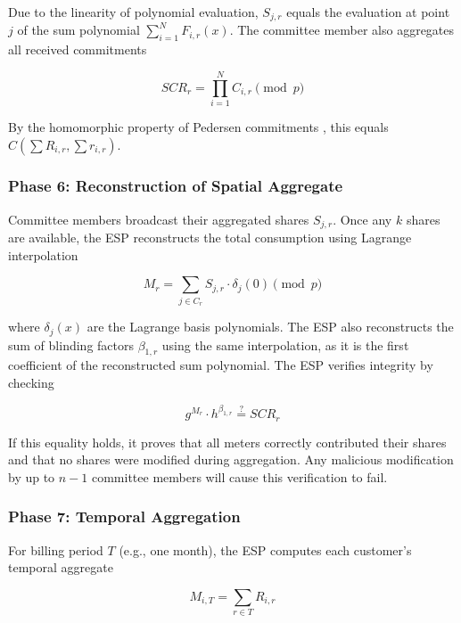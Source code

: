 \documentclass[conference]{IEEEtran}
\begin{document}
Due to the linearity of polynomial evaluation, $S_{j,r}$ equals the evaluation at point $j$ of the sum polynomial $\sum_{i=1}^{N} F_{i,r}(x)$. The committee member also aggregates all received commitments

\begin{equation}
\mathit{SCR}_r = \prod_{i=1}^{N} C_{i,r} \pmod{p}
\end{equation}

By the homomorphic property of Pedersen commitments \cite{pedersen1991non}, this equals $C(\sum R_{i,r}, \sum r_{i,r})$.

\subsubsection{Phase 6: Reconstruction of Spatial Aggregate}

Committee members broadcast their aggregated shares $S_{j,r}$. Once any $k$ shares are available, the ESP reconstructs the total consumption using Lagrange interpolation

\begin{equation}
M_r = \sum_{j \in C_r} S_{j,r} \cdot \delta_j(0) \pmod{p}
\end{equation}

where $\delta_j(x)$ are the Lagrange basis polynomials. The ESP also reconstructs the sum of blinding factors $\beta_{1,r}$ using the same interpolation, as it is the first coefficient of the reconstructed sum polynomial. The ESP verifies integrity by checking

\begin{equation}
g^{M_r} \cdot h^{\beta_{1,r}} \stackrel{?}{=} \mathit{SCR}_r
\end{equation}

If this equality holds, it proves that all meters correctly contributed their shares and that no shares were modified during aggregation. Any malicious modification by up to $n-1$ committee members will cause this verification to fail.

\subsubsection{Phase 7: Temporal Aggregation}

For billing period $T$ (e.g., one month), the ESP computes each customer's temporal aggregate

\begin{equation}
M_{i,T} = \sum_{r \in T} R_{i,r}
\end{equation}
\end{document}
